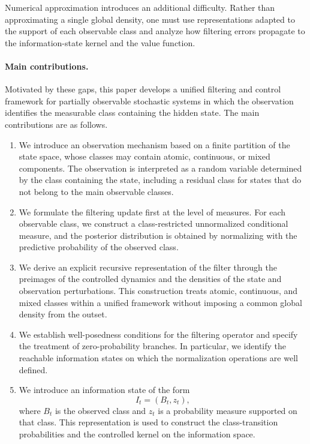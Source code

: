 \documentclass[10pt,twocolumn]{article}
\theoremstyle{remark}
\begin{document}
Numerical approximation introduces an additional difficulty. Rather than approximating a single global density, one must use representations adapted to the support of each observable class and analyze how filtering errors propagate to the information-state kernel and the value function.

\paragraph{Main contributions.}
Motivated by these gaps, this paper develops a unified filtering and control framework for partially observable stochastic systems in which the observation identifies the measurable class containing the hidden state. The main contributions are as follows.

\begin{enumerate}
	\item We introduce an observation mechanism based on a finite partition of the state space, whose classes may contain atomic, continuous, or mixed components. The observation is interpreted as a random variable determined by the class containing the state, including a residual class for states that do not belong to the main observable classes.
	
	\item We formulate the filtering update first at the level of measures. For each observable class, we construct a class-restricted unnormalized conditional measure, and the posterior distribution is obtained by normalizing with the predictive probability of the observed class.
	
	\item We derive an explicit recursive representation of the filter through the preimages of the controlled dynamics and the densities of the state and observation perturbations. This construction treats atomic, continuous, and mixed classes within a unified framework without imposing a common global density from the outset.
	
	\item We establish well-posedness conditions for the filtering operator and specify the treatment of zero-probability branches. In particular, we identify the reachable information states on which the normalization operations are well defined.
	
	\item We introduce an information state of the form
	\[
	I_t=(B_t,z_t),
	\]
	where \(B_t\) is the observed class and \(z_t\) is a probability measure supported on that class. This representation is used to construct the class-transition probabilities and the controlled kernel on the information space.
	

\end{enumerate}
\end{document}
